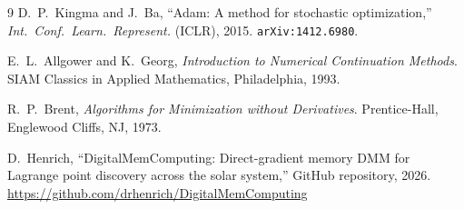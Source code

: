 \documentclass[10pt,twocolumn]{article}
\begin{document}
\begin{thebibliography}{9}
D.~P.~Kingma and J.~Ba,
``Adam: A method for stochastic optimization,''
\textit{Int.\ Conf.\ Learn.\ Represent.} (ICLR), 2015.
\texttt{arXiv:1412.6980}.

E.~L.~Allgower and K.~Georg,
\textit{Introduction to Numerical Continuation Methods}.
SIAM Classics in Applied Mathematics, Philadelphia, 1993.

R.~P.~Brent,
\textit{Algorithms for Minimization without Derivatives}.
Prentice-Hall, Englewood Cliffs, NJ, 1973.

D.~Henrich,
``DigitalMemComputing: Direct-gradient memory DMM for Lagrange point
discovery across the solar system,''
GitHub repository, 2026.
\url{https://github.com/drhenrich/DigitalMemComputing}

\end{thebibliography}
\end{document}
